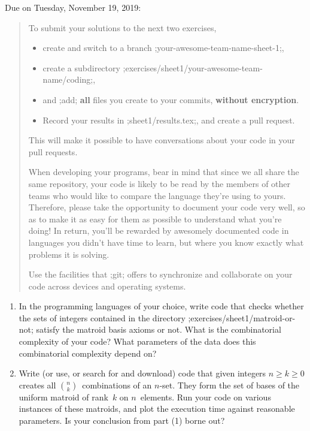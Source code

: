 \documentclass[11pt]{amsart}
\newcommand{\defn}[1]{{\color{blue}#1}}
\newcommand{\alert}[1]{\textbf{\color{red}#1}}
\begin{document}
\bigskip
\begin{center}
  \color{blue}Due on Tuesday, November 19, 2019:
\end{center}

\begin{quotation}\small
  To submit your solutions to the next two exercises,
  \begin{itemize}[$\quad\triangleright$]
  \item create and switch to a branch ;your-awesome-team-name-sheet-1;,
  \item create a subdirectory ;exercises/sheet1/your-awesome-team-name/coding;,
  \item and ;add; \alert{all} files you create to your commits, \alert{without encryption}.
  \item Record your results in ;sheet1/results.tex;, and create a pull request.
  \end{itemize}
  This will make it possible to have conversations about your code in your pull requests.

  When developing your programs, bear in mind that since we all share the same repository,
  your code is likely to be read by the members of other teams who would like to compare the language they're using to yours.
  Therefore, please take the opportunity to document your code very well, so as to make it as easy for them as possible to understand what you're doing!
  In return, you'll be rewarded by awesomely documented code in languages you didn't have time to learn, but where you know exactly what problems it is solving.

  Use the facilities that ;git; offers to synchronize and collaborate on your code across devices and operating systems.
\end{quotation}

\bigskip
\begin{enumerate}
\item
  In the programming languages of your choice,
  write code that checks whether the sets of integers contained in the directory ;exercises/sheet1/matroid-or-not; satisfy the matroid basis axioms or not.
  What is the combinatorial complexity of your code?
  What parameters of the data does this combinatorial complexity depend on?

\item
  Write (or use, or search for and download) code that given integers $n\ge k\ge0$ creates all $\binom{n}{k}$~combinations of an $n$-set.
  They form the set of bases of the \defn{uniform matroid of rank~$k$ on $n$~elements}.
  Run your code on various instances of these matroids, and plot the execution time against reasonable parameters.
  Is your conclusion from part (1) borne out?
\end{enumerate}
\end{document}
